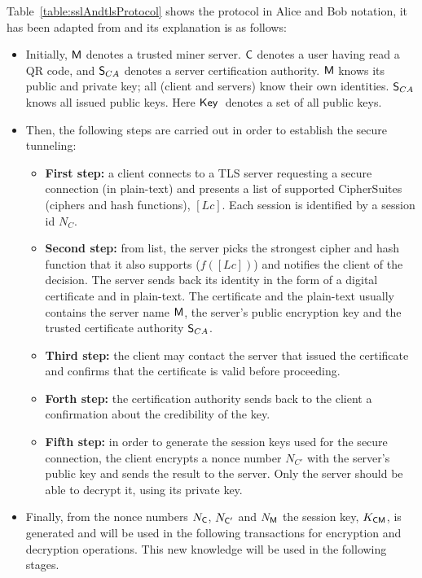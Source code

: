 Table~\ref{table:sslAndtlsProtocol} shows the protocol in Alice and Bob 
notation, it has been adapted from \cite{lopez13} and its explanation is as follows:
\begin{itemize}
  \item Initially, $\textsf{M}$ denotes a trusted miner server. $\textsf{C}$ denotes
    a user having read a QR code, and $\textsf{S}_{CA}$ denotes a server certification 
    authority. $\textsf{M}$ knows its public and private key; all (client and servers) 
    know their own identities. $\textsf{S}_{CA}$ knows all issued
    public keys. Here $\textsf{Key}\;$ denotes a set of all public keys.
  \item Then, the following steps are carried out in order to
    establish the secure tunneling:
    \begin{itemize}
    \item \textbf{First step:} a client connects to a TLS server
      requesting a secure connection (in plain-text) and presents a list
      of supported CipherSuites (ciphers and hash functions),
      $[Lc]$. Each session is identified by a session id $N_{C}$. 
    \item \textbf{Second step:} from list, the server picks the
      strongest cipher and hash function that it also supports
      ($f([Lc])$) and notifies the client of the decision. The server
      sends back its identity in the form of a digital certificate and
      in plain-text. The certificate and the plain-text usually contains
      the server name $\textsf{M}$, the server's public encryption
      key and the trusted certificate authority $\textsf{S}_{CA}$. 
    \item \textbf{Third step:} the client may contact the
      server that issued the certificate and confirms that the
      certificate is valid before proceeding.
    \item \textbf{Forth step:} the certification authority sends back to the 
      client a confirmation about the credibility of the key.
    \item \textbf{Fifth step:} in order to generate the session keys used for the
      secure connection, the client encrypts a nonce number $N_{C'}$
      with the server's public key and sends the result to the
      server. Only the server should be able to decrypt it, using its
      private key.  
    \end{itemize}
\item Finally, from the nonce numbers $N_{\textsf{C}}$, $N_{\textsf{C}'}$ and $N_{\textsf{M}}$
    the session key, $K_{\textsf{C}\textsf{M}}$, is generated and will be used  in the 
    following transactions for encryption and decryption operations. This new
    knowledge will be used in the following stages.  
\end{itemize}



